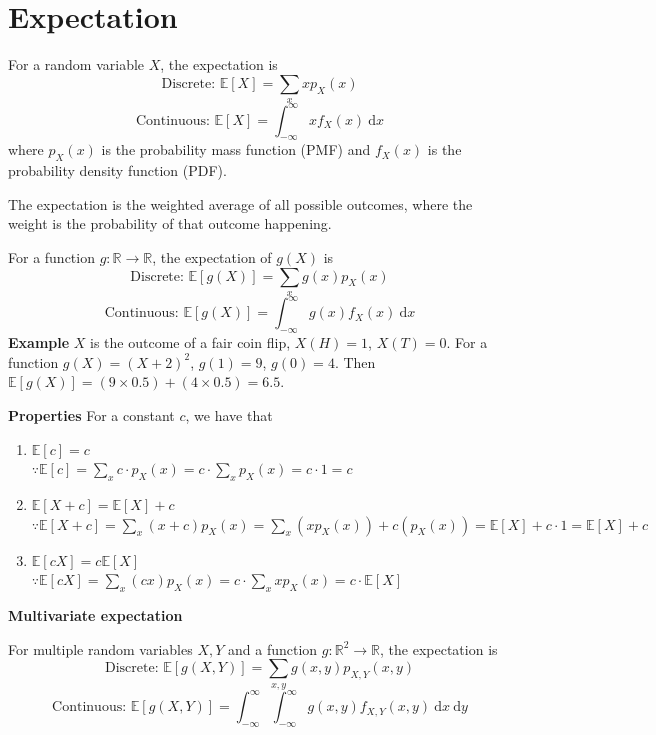 \documentclass[../Probability.tex]{subfiles}
\begin{document}
\section{Expectation}
For a random variable $X$, the expectation is
\[\text{Discrete: } \mathbb{E}[X]=\sum_xxp_X(x)\]
\[\text{Continuous: } \mathbb{E}[X]=\int_{-\infty}^{\infty}xf_X(x)\:\mathrm{d}x\]
where $p_X(x)$ is the probability mass function (PMF) and $f_X(x)$ is the probability density function (PDF).

\noindent The expectation is the weighted average of all possible outcomes, 
where the weight is the probability of that outcome happening.

\medskip
\noindent For a function $g:\mathbb{R}\rightarrow\mathbb{R}$,
the expectation of $g(X)$ is
\[\text{Discrete: } \mathbb{E}[g(X)]=\sum_xg(x)p_X(x)\]
\[\text{Continuous: } \mathbb{E}[g(X)]=\int_{-\infty}^{\infty}g(x)f_X(x)\:\mathrm{d}x\]
\textbf{Example} $X$ is the outcome of a fair coin flip, $X(H)=1$, $X(T)=0$. \newline
For a function $g(X)=(X+2)^2$, $g(1)=9$, $g(0)=4$. \newline
Then $\mathbb{E}[g(X)]=(9\times0.5) + (4\times0.5)=6.5$.

\medskip
\noindent\textbf{Properties} For a constant $c$, we have that
\begin{enumerate}
    \item $\mathbb{E}[c]=c$\\[5pt]
    $\because \mathbb{E}[c]=\sum_xc\cdot p_X(x)=c\cdot \sum_xp_X(x)=c \cdot 1=c$
    \item $\mathbb{E}[X+c]=\mathbb{E}[X]+c$\\[5pt]
    $\because \mathbb{E}[X+c]=\sum_x(x+c)p_X(x)=\sum_x(xp_X(x))+c(p_X(x))=\mathbb{E}[X]+c\cdot 1=\mathbb{E}[X]+c$
    \item $\mathbb{E}[cX]=c\mathbb{E}[X]$\\[5pt]
    $\because \mathbb{E}[cX]=\sum_x(cx)p_X(x)=c\cdot \sum_xxp_X(x)=c\cdot \mathbb{E}[X]$
\end{enumerate}

\medskip
\noindent\textbf{Multivariate expectation}

\noindent For multiple random variables $X,Y$ and a function $g:\mathbb{R}^2\rightarrow\mathbb{R}$, the expectation is
\[\text{Discrete: }\mathbb{E}[g(X, Y)]=\sum_{x, y}g(x, y)p_{X, Y}(x, y)\]
\[\text{Continuous: }\mathbb{E}[g(X, Y)] = \int_{-\infty}^{\infty}\int_{-\infty}^{\infty}g(x, y)f_{X, Y}(x, y)\:\mathrm{d}x\:\mathrm{d}y\]
\end{document}
